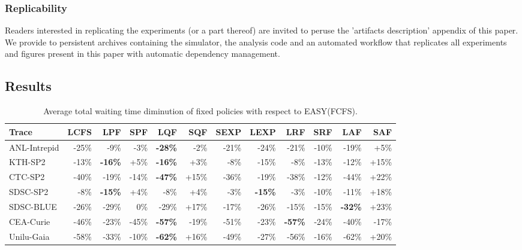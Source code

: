 \documentclass[sigconf,review,anonymous]{acmart}
\newcommand{\ra}[1]{\renewcommand{\arraystretch}{#1}}
\begin{document}
\subsubsection{Replicability}

Readers interested in replicating the experiments (or a part thereof) are
invited to peruse the 'artifacts description' appendix of this paper. We
provide to persistent archives containing the simulator, the analysis code and
an automated workflow that replicates all experiments and figures present in
this paper with automatic dependency management.

\subsection{Results}
\label{sub:results}

\begin{table}[]
  \centering
  \ra{1.3}
  \caption{Average total waiting time diminution of fixed policies with respect to EASY(FCFS).}


  \label{tab:full}
  \begin{tabular}{@{}lrrrrrrrrrrr@{}}
    \hline
    Trace        & LCFS  & LPF            & SPF   & LQF            & SQF   & SEXP  & LEXP           & LRF            & SRF   & LAF          & SAF   \\
    \hline
    ANL-Intrepid & -25\% & -9\%           & -3\%  & \textbf{-28\%} & -2\%  & -21\% & -24\%          & -21\%          & -10\% & -19\%        & +5\%  \\
    KTH-SP2      & -13\% & \textbf{-16\%} & +5\%  & \textbf{-16\%} & +3\%  & -8\%  & -15\%          & -8\%           & -13\% & -12\%        & +15\% \\
    CTC-SP2      & -40\% & -19\%          & -14\% & \textbf{-47\%} & +15\% & -36\% & -19\%          & -38\%          & -12\% & -44\%        & +22\% \\
    SDSC-SP2     & -8\%  & \textbf{-15\%} & +4\%  & -8\%           & +4\%  & -3\%  & \textbf{-15\%} & -3\%           & -10\% & -11\%        & +18\% \\
    SDSC-BLUE    & -26\% & -29\%          & 0\%   & -29\%          & +17\% & -17\% & -26\%          & -15\%          & -15\% & \textbf{-32\%} & +23\% \\
    CEA-Curie    & -46\% & -23\%          & -45\% & \textbf{-57\%} & -19\% & -51\% & -23\%          & \textbf{-57\%} & -24\% & -40\%        & -17\% \\
    Unilu-Gaia   & -58\% & -33\%          & -10\% & \textbf{-62\%} & +16\% & -49\% & -27\%          & -56\%          & -16\% & -62\%        & +20\% \\
    \hline
  \end{tabular}
\end{table}
\end{document}
